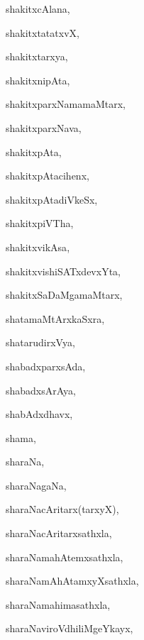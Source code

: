 \begin{multicols}{3}
{\noindent
{shakitxcAlana}, \pageref{shakitxcAlana}

\noindent
{shakitxtatatxvX}, \pageref{shakitxtatatxvX}

\noindent
{shakitxtarxya}, \pageref{shakitxtarxya}

\noindent
{shakitxnipAta}, \pageref{shakitxnipAta}

\noindent
{shakitxparxNamamaMtarx}, \pageref{shakitxparxNamamaMtarx}

\noindent
{shakitxparxNava}, \pageref{shakitxparxNava}

\noindent
{shakitxpAta}, \pageref{shakitxpAta}

\noindent
{shakitxpAtacihenx}, \pageref{shakitxpAtacihenx}

\noindent
{shakitxpAtadiVkeSx}, \pageref{shakitxpAtadiVkeSx}

\noindent
{shakitxpiVTha}, \pageref{shakitxpiVTha}

\noindent
{shakitxvikAsa}, \pageref{shakitxvikAsa}

\noindent
{shakitxvishiSATxdevxYta}, \pageref{shakitxvishiSATxdevxYta}

\noindent
{shakitxSaDaMgamaMtarx}, \pageref{shakitxSaDaMgamaMtarx}

\noindent
{shatamaMtArxkaSxra}, \pageref{shatamaMtArxkaSxra}

\noindent
{shatarudirxVya}, \pageref{shatarudirxVya}

\noindent
{shabadxparxsAda}, \pageref{shabadxparxsAda}

\noindent
{shabadxsArAya}, \pageref{shabadxsArAya}

\noindent
{shabAdxdhavx}, \pageref{shabAdxdhavx}

\noindent
{shama}, \pageref{shama}

\noindent
{sharaNa}, \pageref{sharaNa}

\noindent
{sharaNagaNa}, \pageref{sharaNagaNa}

\noindent
{sharaNacAritarx(tarxyX)}, \pageref{sharaNacAritarxtarxyX}

\noindent
{sharaNacAritarxsathxla}, \pageref{sharaNacAritarxsathxla}

\noindent
{sharaNamahAtemxsathxla}, \pageref{sharaNamahAtemxsathxla}

\noindent
{sharaNamAhAtamxyXsathxla}, \pageref{sharaNamAhAtamxyXsathxla}

\noindent
{sharaNamahimasathxla}, \pageref{sharaNamahimasathxla}

\noindent
{sharaNaviroVdhiliMgeYkayx}, \pageref{sharaNaviroVdhiliMgeYkayx}

}
\end{multicols}
